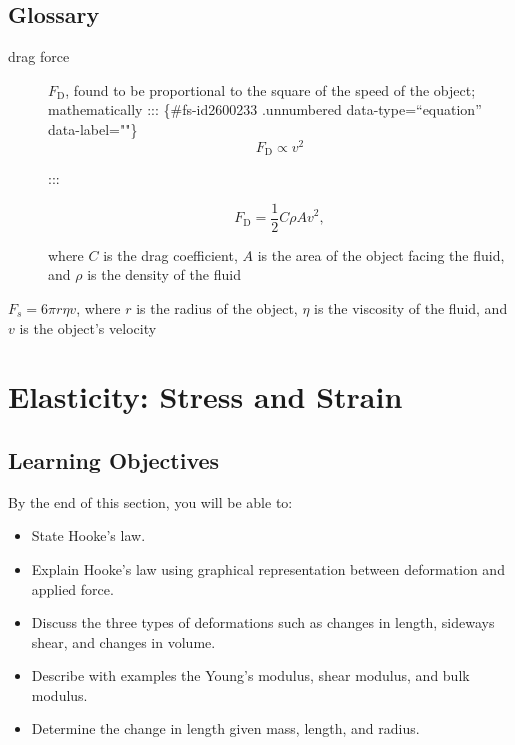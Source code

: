 \documentclass[
]{book}
\providecommand{\tightlist}{%
  \setlength{\itemsep}{0pt}\setlength{\parskip}{0pt}}
\newenvironment{unnumbered}{}{}
\newenvironment{learning-objectives}{}{}
\begin{document}
\hypertarget{glossary-18}{%
\subsection{Glossary}\label{glossary-18}}

\begin{description}
\item[drag force]
\(F_{\text{D}}{}\), found to be proportional to the square of the
speed of the object; mathematically
::: \{\#fs-id2600233 .unnumbered data-type=``equation'' data-label=""\}
\[{{F_{\text{D}} \propto}v^{\text{2}}}{}\]

:::

\hypertarget{fs-id2594583}{}
\begin{unnumbered}

\[{{F_{\text{D}} = \frac{1}{2}}{C\rho}{Av}^{2},}{}\]

\end{unnumbered}

where \(C{}\) is the drag coefficient, \(A{}\) is the area of the object
facing the fluid, and \(\rho{}\) is the density of the fluid
\end{description}

\begin{description}
\tightlist
\item[Stokes' law]
\({F_{s} = 6{\pi r\eta v}}{}\), where \(r\) is the radius of the object,
\(\eta\) is the viscosity of the fluid, and \(v\) is the object's
velocity
\end{description}

\hypertarget{elasticity-stress-and-strain}{%
\section{Elasticity: Stress and Strain}\label{elasticity-stress-and-strain}}

\hypertarget{import-auto-id0000032}{}
\begin{learning-objectives}

\hypertarget{learning-objectives-22}{%
\subsection{Learning Objectives}\label{learning-objectives-22}}

By the end of this section, you will be able to:

\begin{itemize}
\tightlist
\item
  State Hooke's law.
\item
  Explain Hooke's law using graphical representation between
  deformation and applied force.
\item
  Discuss the three types of deformations such as changes in length,
  sideways shear, and changes in volume.
\item
  Describe with examples the Young's modulus, shear modulus, and bulk
  modulus.
\item
  Determine the change in length given mass, length, and radius.
\end{itemize}

\end{learning-objectives}
\end{document}
